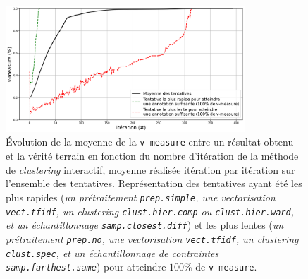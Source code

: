 			\begin{figure}[!htb]
				\centering
				\includegraphics[width=0.8\textwidth]{figures/etude-efficacite-evolution-moyenne-0par-iteration}
				\caption{Évolution de la moyenne de la \texttt{v-measure} entre un résultat obtenu et la vérité terrain en fonction du nombre d'itération de la méthode de \textit{clustering} interactif, moyenne réalisée itération par itération sur l'ensemble des tentatives.
				Représentation des tentatives ayant été les plus rapides (\textit{un prétraitement \texttt{prep.simple}, une vectorisation \texttt{vect.tfidf}, un clustering \texttt{clust.hier.comp} ou \texttt{clust.hier.ward}, et un échantillonnage \texttt{samp.closest.diff}}) et les plus lentes (\textit{un prétraitement \texttt{prep.no}, une vectorisation \texttt{vect.tfidf}, un clustering \texttt{clust.spec}, et un échantillonnage de contraintes \texttt{samp.farthest.same}}) pour atteindre $100$\% de \texttt{v-measure}.}
				\label{figure:4.1.1-ETUDE-CONVERGENCE-EVOLUTION}
			\end{figure}
